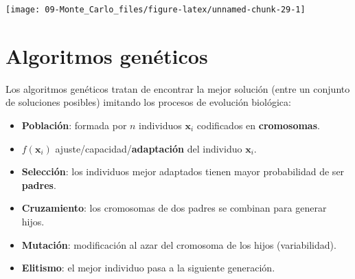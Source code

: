 \documentclass[
]{book}
\newenvironment{Shaded}{\begin{snugshade}}{\end{snugshade}}
\newcommand{\ControlFlowTok}[1]{\textcolor[rgb]{0.13,0.29,0.53}{\textbf{#1}}}
\newcommand{\DataTypeTok}[1]{\textcolor[rgb]{0.13,0.29,0.53}{#1}}
\newcommand{\DecValTok}[1]{\textcolor[rgb]{0.00,0.00,0.81}{#1}}
\newcommand{\KeywordTok}[1]{\textcolor[rgb]{0.13,0.29,0.53}{\textbf{#1}}}
\newcommand{\NormalTok}[1]{#1}
\newcommand{\OperatorTok}[1]{\textcolor[rgb]{0.81,0.36,0.00}{\textbf{#1}}}
\newcommand{\StringTok}[1]{\textcolor[rgb]{0.31,0.60,0.02}{#1}}
\theoremstyle{break}
\theoremstyle{definition}
\theoremstyle{definition}
\theoremstyle{definition}
\theoremstyle{remark}
\begin{document}
\begin{Shaded}
\end{Shaded}

\begin{center}\texttt{[image: 09-Monte\_Carlo\_files/figure-latex/unnamed-chunk-29-1]} \end{center}

\hypertarget{algoritmos-genuxe9ticos}{%
\section{Algoritmos genéticos}\label{algoritmos-genuxe9ticos}}

Los algoritmos genéticos tratan de encontrar la mejor solución
(entre un conjunto de soluciones posibles) imitando los procesos de
evolución biológica:

\begin{itemize}
\item
  \textbf{Población}: formada por \(n\) individuos \(\mathbf{x}_{i}\)
  codificados en \textbf{cromosomas}.
\item
  \(f(\mathbf{x}_{i})\) ajuste/capacidad/\textbf{adaptación} del
  individuo \(\mathbf{x}_{i}\).
\item
  \textbf{Selección}: los individuos mejor adaptados tienen mayor
  probabilidad de ser \textbf{padres}.
\item
  \textbf{Cruzamiento}: los cromosomas de dos padres se combinan para
  generar hijos.
\item
  \textbf{Mutación}: modificación al azar del cromosoma de los
  hijos (variabilidad).
\item
  \textbf{Elitismo}: el mejor individuo pasa a la siguiente generación.
\end{itemize}
\end{document}
